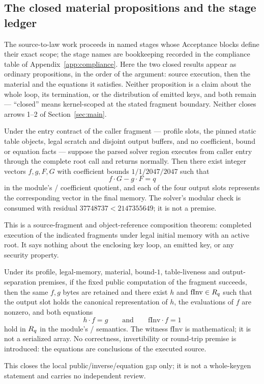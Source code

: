 \subsection{The closed material propositions and the stage ledger}\label{sec:b1status}
The source-to-law work proceeds in named stages whose Acceptance blocks
define their exact scope; the stage names are bookkeeping recorded in
the compliance table of Appendix~\ref{app:compliance}. Here the two
closed results appear as ordinary propositions, in the order of the
argument: source execution, then the material and the equations it
satisfies. Neither proposition is a claim about the whole
 loop, its termination, or the distribution of emitted
keys, and both remain \NOTREVIEWED{} --- ``closed'' means
kernel-scoped at the stated fragment boundary. Neither closes arrows
1--2 of Section~\ref{sec:main}.

\begin{proposition}\label{prop:ntru}
Under the entry contract of the caller fragment --- profile slots, the
pinned static table objects, legal scratch and disjoint output buffers,
and no coefficient, bound or equation facts --- suppose the parsed
solver region executes from caller entry through the complete root
call and returns normally. Then there exist integer vectors $f,g,F,G$
with coefficient bounds $1/1/2047/2047$ such that
\[
 f\cdot G-g\cdot F=q
\]
in the module's / coefficient
quotient, and each of the four output slots represents the
corresponding vector in the final memory. The solver's modular check is
consumed with residual $37748737<2147355649$; it is not a premise.
\end{proposition}
This is a source-fragment and object-reference composition theorem:
completed execution of the indicated fragments under legal initial
memory with an active root. It says nothing about the enclosing key
loop, an emitted key, or any security property.

\begin{proposition}%
\label{prop:pubkey}
Under its profile, legal-memory, material, bound-$1$, table-liveness
and output-separation premises, if the fixed public computation of the
fragment succeeds, then the same $f,g$ bytes are retained and there
exist $h$ and $\mathrm{fInv}\in R_q$ such that the output slot holds the
canonical representation of $h$, the evaluations of $f$ are nonzero,
and both equations
\[
 h\cdot f=g
 \qquad\text{and}\qquad
 \mathrm{fInv}\cdot f=1
\]
hold in $R_q$ in the module's /
semantics. The witness $\mathrm{fInv}$ is mathematical; it is not a
serialized array. No correctness, invertibility or round-trip premise
is introduced: the equations are conclusions of the executed source.
\end{proposition}
This closes the local public/inverse/equation gap only; it is not a
whole-keygen statement and carries no independent review.

